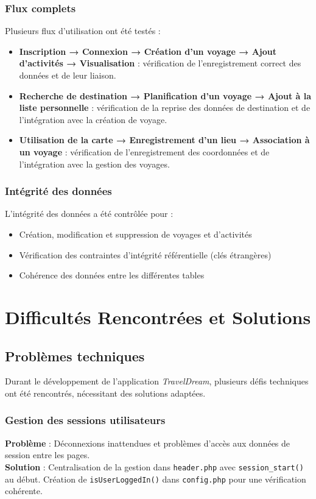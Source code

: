 \documentclass[a4paper,12pt]{article}
\begin{document}
\subsubsection{Flux complets}
Plusieurs flux d’utilisation ont été testés :
\begin{itemize}
  \item \textbf{Inscription → Connexion → Création d’un voyage → Ajout d’activités → Visualisation} : vérification de l’enregistrement correct des données et de leur liaison.
  \item \textbf{Recherche de destination → Planification d’un voyage → Ajout à la liste personnelle} : vérification de la reprise des données de destination et de l’intégration avec la création de voyage.
  \item \textbf{Utilisation de la carte → Enregistrement d’un lieu → Association à un voyage} : vérification de l’enregistrement des coordonnées et de l’intégration avec la gestion des voyages.
\end{itemize}

\subsubsection{Intégrité des données}
L'intégrité des données a été contrôlée pour :
\begin{itemize}
  \item Création, modification et suppression de voyages et d’activités
  \item Vérification des contraintes d'intégrité référentielle (clés étrangères)
  \item Cohérence des données entre les différentes tables
\end{itemize}
\section{Difficultés Rencontrées et Solutions}

\subsection{Problèmes techniques}
Durant le développement de l’application \textit{TravelDream}, plusieurs défis techniques ont été rencontrés, nécessitant des solutions adaptées.

\subsubsection{Gestion des sessions utilisateurs}
\textbf{Problème} : Déconnexions inattendues et problèmes d’accès aux données de session entre les pages.\\
\textbf{Solution} : Centralisation de la gestion dans \texttt{header.php} avec \texttt{session\_start()} au début. Création de \texttt{isUserLoggedIn()} dans \texttt{config.php} pour une vérification cohérente.
\end{document}
